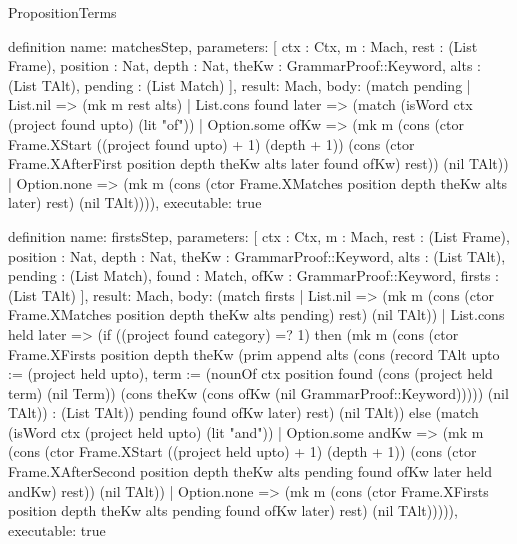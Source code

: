 \begin{lexlean}{PropositionTerms}
\begin{semanticmodule}
definition{
  name: matchesStep,
  parameters: [
    ctx : Ctx,
    m : Mach,
    rest : (List Frame),
    position : Nat,
    depth : Nat,
    theKw : GrammarProof::Keyword,
    alts : (List TAlt),
    pending : (List Match)
  ],
  result: Mach,
  body: (match pending
    | List.nil => (mk m rest alts)
    | List.cons found later => (match (isWord ctx (project found upto) (lit "of"))
      | Option.some ofKw => (mk m (cons (ctor Frame.XStart ((project found upto) + 1) (depth + 1)) (cons (ctor Frame.XAfterFirst position depth theKw alts later found ofKw) rest)) (nil TAlt))
      | Option.none => (mk m (cons (ctor Frame.XMatches position depth theKw alts later) rest) (nil TAlt)))),
  executable: true
}

definition{
  name: firstsStep,
  parameters: [
    ctx : Ctx,
    m : Mach,
    rest : (List Frame),
    position : Nat,
    depth : Nat,
    theKw : GrammarProof::Keyword,
    alts : (List TAlt),
    pending : (List Match),
    found : Match,
    ofKw : GrammarProof::Keyword,
    firsts : (List TAlt)
  ],
  result: Mach,
  body: (match firsts
    | List.nil => (mk m (cons (ctor Frame.XMatches position depth theKw alts pending) rest) (nil TAlt))
    | List.cons held later => (if ((project found category) =? 1) then (mk m (cons (ctor Frame.XFirsts position depth theKw (prim append alts (cons (record TAlt {upto := (project held upto), term := (nounOf ctx position found (cons (project held term) (nil Term)) (cons theKw (cons ofKw (nil GrammarProof::Keyword))))}) (nil TAlt)) : (List TAlt)) pending found ofKw later) rest) (nil TAlt)) else (match (isWord ctx (project held upto) (lit "and"))
      | Option.some andKw => (mk m (cons (ctor Frame.XStart ((project held upto) + 1) (depth + 1)) (cons (ctor Frame.XAfterSecond position depth theKw alts pending found ofKw later held andKw) rest)) (nil TAlt))
      | Option.none => (mk m (cons (ctor Frame.XFirsts position depth theKw alts pending found ofKw later) rest) (nil TAlt))))),
  executable: true
}


\end{semanticmodule}
\end{lexlean}
